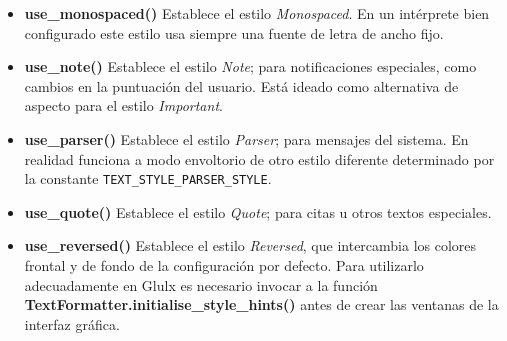 \documentclass[a4paper,12pt]{article}
\numberwithin{equation}{section}
\begin{document}
\begin{itemize}
	\item \textbf{use\_monospaced()} Establece el estilo \emph{Monospaced}. En un intérprete bien configurado este estilo usa siempre una fuente de letra de ancho fijo.

	\item \textbf{use\_note()} Establece el estilo \emph{Note}; para notificaciones especiales, como cambios en la puntuación del usuario. Está ideado como alternativa de aspecto para el estilo \emph{Important}.

	\item \textbf{use\_parser()} Establece el estilo \emph{Parser}; para mensajes del sistema. En realidad funciona a modo envoltorio de otro estilo diferente determinado por la constante \verb|TEXT_STYLE_PARSER_STYLE|.

	\item \textbf{use\_quote()} Establece el estilo \emph{Quote}; para citas u otros textos especiales.

	\item \textbf{use\_reversed()} Establece el estilo \emph{Reversed}, que intercambia los colores frontal y de fondo de la configuración por defecto. Para utilizarlo adecuadamente en Glulx es necesario invocar a la función \textbf{TextFormatter.initialise\_style\_hints()} antes de crear las ventanas de la interfaz gráfica.


\end{itemize}
\end{document}
